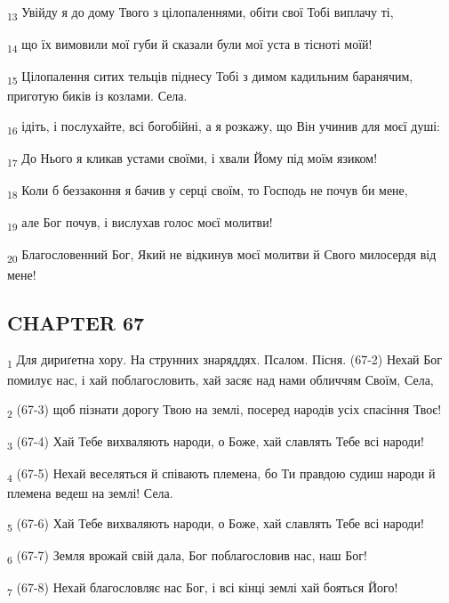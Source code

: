\begin{tcolorbox}
\textsubscript{13} Увійду я до дому Твого з цілопаленнями, обіти свої Тобі виплачу ті,
\end{tcolorbox}
\begin{tcolorbox}
\textsubscript{14} що їх вимовили мої губи й сказали були мої уста в тісноті моїй!
\end{tcolorbox}
\begin{tcolorbox}
\textsubscript{15} Цілопалення ситих тельців піднесу Тобі з димом кадильним баранячим, приготую биків із козлами. Села.
\end{tcolorbox}
\begin{tcolorbox}
\textsubscript{16} ідіть, і послухайте, всі богобійні, а я розкажу, що Він учинив для моєї душі:
\end{tcolorbox}
\begin{tcolorbox}
\textsubscript{17} До Нього я кликав устами своїми, і хвали Йому під моїм язиком!
\end{tcolorbox}
\begin{tcolorbox}
\textsubscript{18} Коли б беззаконня я бачив у серці своїм, то Господь не почув би мене,
\end{tcolorbox}
\begin{tcolorbox}
\textsubscript{19} але Бог почув, і вислухав голос моєї молитви!
\end{tcolorbox}
\begin{tcolorbox}
\textsubscript{20} Благословенний Бог, Який не відкинув моєї молитви й Свого милосердя від мене!
\end{tcolorbox}
\subsection{CHAPTER 67}
\begin{tcolorbox}
\textsubscript{1} Для дириґетна хору. На струнних знаряддях. Псалом. Пісня. (67-2) Нехай Бог помилує нас, і хай поблагословить, хай засяє над нами обличчям Своїм, Села,
\end{tcolorbox}
\begin{tcolorbox}
\textsubscript{2} (67-3) щоб пізнати дорогу Твою на землі, посеред народів усіх спасіння Твоє!
\end{tcolorbox}
\begin{tcolorbox}
\textsubscript{3} (67-4) Хай Тебе вихваляють народи, о Боже, хай славлять Тебе всі народи!
\end{tcolorbox}
\begin{tcolorbox}
\textsubscript{4} (67-5) Нехай веселяться й співають племена, бо Ти правдою судиш народи й племена ведеш на землі! Села.
\end{tcolorbox}
\begin{tcolorbox}
\textsubscript{5} (67-6) Хай Тебе вихваляють народи, о Боже, хай славлять Тебе всі народи!
\end{tcolorbox}
\begin{tcolorbox}
\textsubscript{6} (67-7) Земля врожай свій дала, Бог поблагословив нас, наш Бог!
\end{tcolorbox}
\begin{tcolorbox}
\textsubscript{7} (67-8) Нехай благословляє нас Бог, і всі кінці землі хай бояться Його!
\end{tcolorbox}
